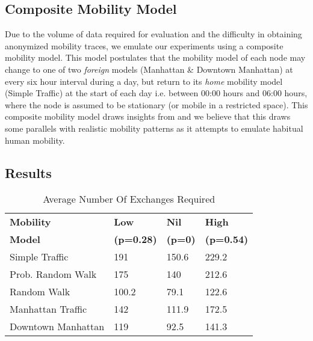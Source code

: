 \documentclass[letterpaper,twocolumn]{sig-alternate}
\begin{document}
\subsection{Composite Mobility Model}
\label{composite}

Due to the volume of data required for evaluation and the difficulty in obtaining anonymized mobility traces, we emulate our experiments using a composite mobility model. This model postulates that the mobility model of each node may change to one of two {\em foreign} models (Manhattan \& Downtown Manhattan) at every six hour interval during a day, but return to its {\em home} mobility model (Simple Traffic) at the start of each day i.e. between 00:00 hours and 06:00 hours, where the node is assumed to be stationary (or mobile in a restricted space). This composite mobility model draws insights from \cite{isaacman2012human,becker2013human,song2010limits,musolesi2007designing} and we believe that this draws some parallels with realistic mobility patterns as it attempts to emulate habitual human mobility. 


\subsection{Results}
\label{results}



\begin{table}[H]
\centering
\begin{tabular}{| l | l | l | l |}
\hline 
\textbf{Mobility} & \textbf{Low} & \textbf{Nil}& \textbf{High}\\ 
\textbf{Model} & \textbf{(p=0.28)} & \textbf{(p=0)}& \textbf{(p=0.54)}\\ 
\hline

 Simple Traffic & 191 & 150.6 & 229.2\\ 
 \hline
 Prob. Random Walk & 175 & 140 & 212.6\\ 
 \hline
 Random Walk & 100.2 & 79.1 & 122.6\\ 
 \hline
 Manhattan Traffic & 142 & 111.9 & 172.5\\ 
 \hline
 Downtown Manhattan & 119 & 92.5 & 141.3\\ 
 \hline
\end{tabular}
\caption {Average Number Of Exchanges Required}
\label{table:avg}
\end{table}
\end{document}
